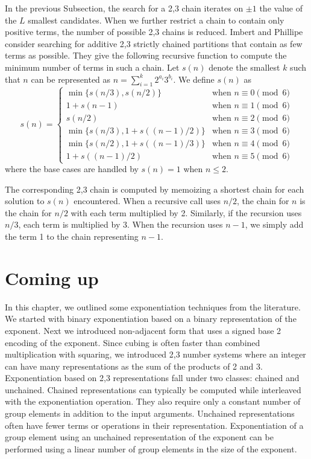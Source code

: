 \documentclass{ucalgthes1}
\theoremstyle{definition}
\begin{document}
In the previous Subsection, the search for a 2,3 chain iterates on $\pm 1$ the value of the $L$ smallest candidates.  When we further restrict a chain to contain only positive terms, the number of possible 2,3 chains is reduced.  Imbert and Phillipe \cite{Imbert2010b} consider searching for additive 2,3 strictly chained partitions that contain as few terms as possible.  They give the following recursive function to compute the minimum number of terms in such a chain. Let $s(n)$ denote the smallest $k$ such that $n$ can be represented as $n = \sum_{i=1}^k 2^{a_i} 3^{b_i}$. We define $s(n)$ as
\begin{equation*}
s(n) = \begin{cases}
	\min\{s(n/3), s(n/2)\} & \textrm{when } n \equiv 0 \pmod 6 \\
	1 + s(n-1) & \textrm{when } n \equiv 1 \pmod 6 \\
	s(n/2) & \textrm{when } n \equiv 2 \pmod 6 \\
	\min\{s(n/3), 1 + s((n-1)/2)\} & \textrm{when } n \equiv 3 \pmod 6 \\ 
	\min\{s(n/2), 1 + s((n-1)/3)\} & \textrm{when } n \equiv 4 \pmod 6 \\
	1 + s((n-1)/2) & \textrm{when } n \equiv 5 \pmod 6
\end{cases}
\end{equation*}
where the base cases are handled by $s(n) = 1$ when $n \le 2$.

The corresponding 2,3 chain is computed by memoizing a shortest chain for each solution to $s(n)$ encountered. When a recursive call uses $n/2$, the chain for $n$ is the chain for $n/2$ with each term multiplied by 2.  Similarly, if the recursion uses $n/3$, each term is multiplied by 3.  When the recursion uses $n-1$, we simply add the term 1 to the chain representing $n-1$.

\bigbreak
\section{Coming up}

In this chapter, we outlined some exponentiation techniques from the literature.  We started with binary exponentiation based on a binary representation of the exponent.  Next we introduced non-adjacent form that uses a signed base 2 encoding of the exponent.  Since cubing is often faster than combined multiplication with squaring, we introduced 2,3 number systems where an integer can have many representations as the sum of the products of 2 and 3.  Exponentiation based on 2,3 representations fall under two classes: chained and unchained.  Chained representations can typically be computed while interleaved with the exponentiation operation.  They also require only a constant number of group elements in addition to the input arguments.  Unchained representations often have fewer terms or operations in their representation.  Exponentiation of a group element using an unchained representation of the exponent can be performed using a linear number of group elements in the size of the exponent.
\end{document}
